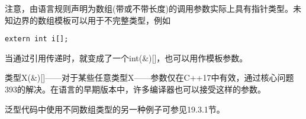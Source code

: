 注意，由语言规则声明为数组(带或不带长度)的调用参数实际上具有指针类型。未知边界的数组模板可以用于不完整类型，例如

\begin{lstlisting}[style=styleCXX]
extern int i[];
\end{lstlisting}

当通过引用传递时，就变成了一个int(\&)[]，也可以用作模板参数。

\begin{tcolorbox}[colback=webgreen!5!white,colframe=webgreen!75!black]
\hspace*{0.75cm}类型X(\&)[]——对于某些任意类型X——参数仅在C++17中有效，通过核心问题393的解决。在语言的早期版本中，许多编译器也可以接受这样的参数。
\end{tcolorbox}

泛型代码中使用不同数组类型的另一种例子可参见19.3.1节。

















